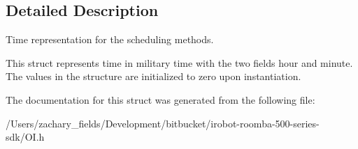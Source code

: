 \subsection{Detailed Description}
Time representation for the scheduling methods. 

This struct represents time in military time with the two fields hour and minute. The values in the structure are initialized to zero upon instantiation. 

The documentation for this struct was generated from the following file\+:\begin{DoxyCompactItemize}
\item 
/\+Users/zachary\+\_\+fields/\+Development/bitbucket/irobot-\/roomba-\/500-\/series-\/sdk/O\+I.\+h\end{DoxyCompactItemize}
